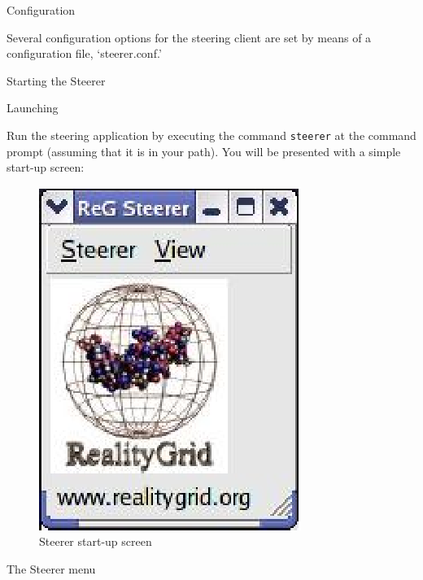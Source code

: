 \documentclass[a4paper,twoside]{article}
\begin{document}

\begin{section}{Configuration}

Several configuration options for the steering client are set by
means of a configuration file, `steerer.conf.'

\end{section}

\begin{section}{Starting the Steerer}

\begin{subsection}{Launching}

Run the steering application by executing the command \texttt{steerer}
at the command prompt (assuming that it is in your path). You will be
presented with a simple start-up screen:


\begin{figure}
\centerline{\includegraphics{startup_screen.eps}}
\caption{Steerer start-up screen}
\label{fig:startup_screen}
\end{figure}

\end{subsection}

\begin{subsection}{The Steerer menu}



\end{subsection}
\end{section}
\end{document}
